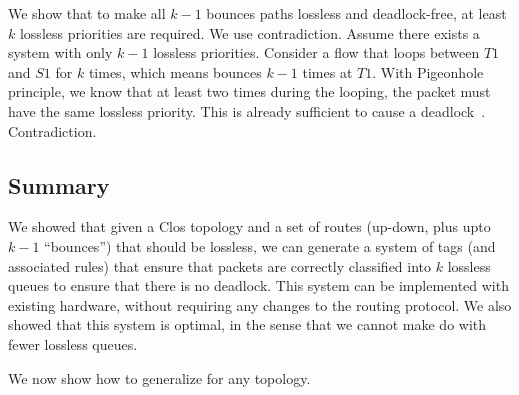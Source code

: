  We show that
to make all $k-1$ bounces paths lossless and deadlock-free, at least $k$
lossless priorities are required. We use contradiction.  Assume there exists a
system with only $k-1$ lossless priorities. Consider a flow that loops between
$T1$ and $S1$ for $k$ times, which means bounces $k-1$ times at $T1$. With
Pigeonhole principle, we know that at least two times during the looping, the
packet must have the same lossless priority. This is already sufficient to cause
a deadlock~\cite{our_hotnets_paper}. Contradiction.

\subsection {Summary}

We showed that given a Clos topology and a set of routes (up-down, plus
upto $k-1$ ``bounces'') that should be lossless, we can generate a system of
tags (and associated rules) that ensure that packets are correctly classified
into $k$ lossless queues to ensure that there is no deadlock.   This system can
be implemented with existing hardware, without requiring any changes to the
routing protocol. We also showed that this system is optimal, in the sense that
we cannot make do with fewer lossless queues.

We now show how to generalize \system{} for any topology.

